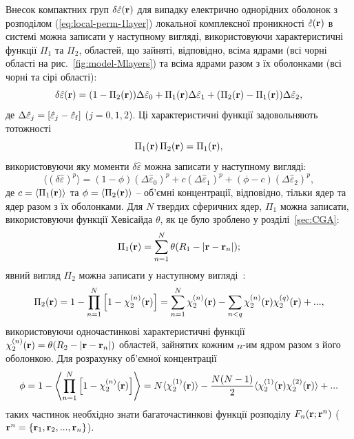 \documentclass[14pt,twoside]{vakthesis}
\begin{document}
Внесок компактних груп $\delta\hat{\varepsilon}({\bf r})$ для  випадку електрично однорідних оболонок з розподілом (\ref{eq:local-perm-1layer}) локальної комплексної проникності $\hat{\varepsilon}({\bf r})$ в системі можна записати у наступному вигляді, використовуючи характеристичні функції $\Pi_1$ та $\Pi_2$, областей, що зайняті, відповідно, всіма ядрами (всі чорні області на рис.~\ref{fig:model-Mlayers}) та всіма ядрами разом з їх оболонками (всі чорні та сірі області):
\begin{equation}\label{eq:delta-eps-1layer}
\delta\hat{\varepsilon} ({\bf r}) = (1 - \Pi_2 ({\bf r})) \Delta\hat{\varepsilon}_0
+ \Pi_1 ({\bf r}) \Delta\hat{\varepsilon}_1
+ (\Pi_2 ({\bf r}) - \Pi_1 ({\bf r})) \Delta\hat{\varepsilon}_2,
\end{equation}
де $\Delta\hat{\varepsilon}_j = [\hat{\varepsilon}_j - 
\hat{\varepsilon}_{\rm f}]$ ($j = 0,1,2$). 
Ці характеристичні функції задовольняють тотожності $$\Pi_1({\bf r})\,\Pi_2({\bf r}) = \Pi_1({\bf r}),$$ використовуючи яку моменти $\delta\hat{\varepsilon}$ можна записати у наступному вигляді:
\begin{equation}\label{eq:moment-1layer}
\langle (\delta\hat{\varepsilon})^p \rangle = (1 - \phi) (\Delta\hat{\varepsilon}_0)^p 
+ c (\Delta\hat{\varepsilon}_1)^p
+ (\phi - c) (\Delta\hat{\varepsilon}_2)^p,
\end{equation}
де $c = \langle \Pi_1({\bf r}) \rangle$ та $\phi = \langle \Pi_2({\bf r}) \rangle$ -- об'ємні концентрації, відповідно, тільки ядер та ядер разом з їх оболонками. Для $N$ твердих сферичних ядер, $\Pi_1$ можна записати, використовуючи функції Хевісайда $\theta$, як це було зроблено у розділі~\ref{sec:CGA}:
\begin{equation}\label{eq:Pi1}
	\Pi_1({\bf r}) = \sum_{n=1}^N \theta(R_1 - |{\bf r} - {\bf r}_n|);
\end{equation}
явний вигляд $\Pi_2$ можна записати у наступному вигляді~\cite{TorquatoCoreShell, Torquato}:
\begin{equation}\label{eq:Pi2}
\Pi_2 ({\bf r}) = 1 - \prod_{n=1}^{N}\left[ 1 - \chi_2^{(n)}({\bf r}) \right] = \sum_{n=1}^{N}\chi_2^{(n)}({\bf r}) - \sum_{n<q}\chi_2^{(n)}({\bf r})\chi_2^{(q)}({\bf r}) + ..., 
\end{equation}
використовуючи одночастинкові характеристичні функції $\chi^{(n)}_2({\bf r}) = \theta(R_2 - |{\bf r} - {\bf r}_n|)$ областей, зайнятих кожним $n$-им ядром разом з його оболонкою. Для розрахунку об'ємної концентрації 
\begin{equation}\label{eq:phi-full}
\phi = 1 - \left\langle \prod_{n=1}^{N}\left[ 1 - \chi_2^{(n)}({\bf r}) \right] \right\rangle = N \langle \chi_2^{(1)} ({\bf r}) \rangle
- \frac{N(N-1)}{2} \langle \chi_2^{(1)} ({\bf r}) \chi_2^{(2)} ({\bf r}) \rangle + ...
\end{equation}
таких частинок необхідно знати багаточастинкові функції розподілу $F_n({\bf r}; {\bf r}^n)$ (${\bf r}^n = \{{\bf r}_1, {\bf r}_2,..., {\bf r}_n\}$). 
\end{document}
